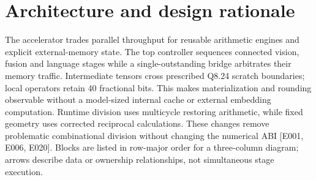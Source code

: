 \documentclass[11pt,a4paper]{article}
\begin{document}
\renewcommand{\abstractname}{\textcolor{vulcanblue}{Abstract}}\begin{abstract}\noindent Anvil-E2 is a parameterized,\allowbreak{} memory-backed SystemVerilog multimodal embedding accelerator supporting text-only,\allowbreak{} vision-only,\allowbreak{} and joint vision-text fusion workloads for Google EmbeddingGemma-2 with signed Q8.24 fixed-point arithmetic. All 29 official-weight multimodal benchmark workloads passed with zero mismatches against the Q8.24 integer oracle and exact scratch-write histories. Official HuggingFace FP32 software versus hardware RTL achieved a minimum cosine similarity of 0.9999999950454138 and a maximum absolute error of 4.734e-05 (\allowbreak{}42x tighter than the 2.000e-03 engineering tolerance bound)\allowbreak{} [\allowbreak{}E070]\allowbreak{}. All four hardware signoff gates passed across 21 SystemVerilog modules: L1 RTL timing lint (\allowbreak{}0 hazards)\allowbreak{} [\allowbreak{}E074]\allowbreak{},\allowbreak{} L2 Intel Quartus Prime 17.1 TimeQuest STA (\allowbreak{}WNS\_\allowbreak{}setup =\allowbreak{} +\allowbreak{}1.027 ns at a 10.0 ns (\allowbreak{}100.0 MHz)\allowbreak{} clock constraint with Fmax =\allowbreak{} 111.45 MHz and 0 failing endpoints)\allowbreak{} [\allowbreak{}E075]\allowbreak{},\allowbreak{} and L3 physical Intel Arria 10 GX PCIe Gen3x8 Hardware-in-the-Loop (\allowbreak{}HIL)\allowbreak{} validation across three deterministic runs with zero bit errors [\allowbreak{}E076]\allowbreak{}.\par{}\end{abstract}\vspace{2pt}

\section{Architecture and design rationale}

The accelerator trades parallel throughput for reusable arithmetic engines and explicit external-memory state. The top controller sequences connected vision,\allowbreak{} fusion and language stages while a single-outstanding bridge arbitrates their memory traffic. Intermediate tensors cross prescribed Q8.24 scratch boundaries; local operators retain 40 fractional bits. This makes materialization and rounding observable without a model-sized internal cache or external embedding computation. Runtime division uses multicycle restoring arithmetic,\allowbreak{} while fixed geometry uses corrected reciprocal calculations. These changes remove problematic combinational division without changing the numerical ABI [\allowbreak{}E001,\allowbreak{} E006,\allowbreak{} E020]\allowbreak{}. Blocks are listed in row-major order for a three-column diagram; arrows describe data or ownership relationships,\allowbreak{} not simultaneous stage execution.
\end{document}
